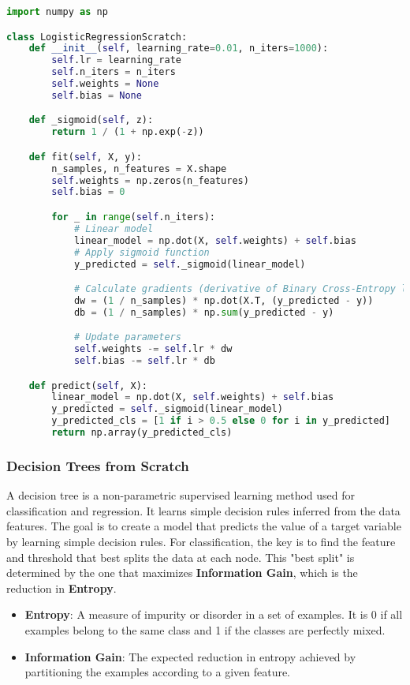 \documentclass[11pt,a4paper]{article}
\begin{document}
\begin{lstlisting}[language=Python]
import numpy as np

class LogisticRegressionScratch:
    def __init__(self, learning_rate=0.01, n_iters=1000):
        self.lr = learning_rate
        self.n_iters = n_iters
        self.weights = None
        self.bias = None

    def _sigmoid(self, z):
        return 1 / (1 + np.exp(-z))

    def fit(self, X, y):
        n_samples, n_features = X.shape
        self.weights = np.zeros(n_features)
        self.bias = 0

        for _ in range(self.n_iters):
            # Linear model
            linear_model = np.dot(X, self.weights) + self.bias
            # Apply sigmoid function
            y_predicted = self._sigmoid(linear_model)

            # Calculate gradients (derivative of Binary Cross-Entropy loss)
            dw = (1 / n_samples) * np.dot(X.T, (y_predicted - y))
            db = (1 / n_samples) * np.sum(y_predicted - y)

            # Update parameters
            self.weights -= self.lr * dw
            self.bias -= self.lr * db

    def predict(self, X):
        linear_model = np.dot(X, self.weights) + self.bias
        y_predicted = self._sigmoid(linear_model)
        y_predicted_cls = [1 if i > 0.5 else 0 for i in y_predicted]
        return np.array(y_predicted_cls)
\end{lstlisting}

\subsubsection{Decision Trees from Scratch}

A decision tree is a non-parametric supervised learning method used for classification and regression. It learns simple decision rules inferred from the data features. The goal is to create a model that predicts the value of a target variable by learning simple decision rules. For classification, the key is to find the feature and threshold that best splits the data at each node. This "best split" is determined by the one that maximizes \textbf{Information Gain}, which is the reduction in \textbf{Entropy}.
\begin{itemize}
    \item \textbf{Entropy}: A measure of impurity or disorder in a set of examples. It is 0 if all examples belong to the same class and 1 if the classes are perfectly mixed.
    \item \textbf{Information Gain}: The expected reduction in entropy achieved by partitioning the examples according to a given feature.
\end{itemize}
\end{document}
